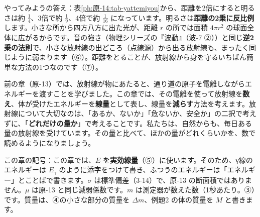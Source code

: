 \noindent やってみようの答え：表\ref{ph:原-14:tab-yattemiyou}から、距離を2倍にすると明るさは約 $\tfrac14$、3倍で約 $\tfrac19$、4倍で約 $\tfrac1{16}$ になっています。明るさは\textbf{距離の2乗に反比例}します。小さな所から四方八方に出た光が、距離 $r$ の所では面積 $4\pi r^2$ の球面全体に広がるからです。音の強さ（物理シリーズの『波動』（波-7 ②））と同じ\textbf{逆2乗の法則}で、小さな放射線の出どころ（点線源）から出る放射線も、まったく同じように弱まります（⑥）。距離をとることが、放射線から身を守るいちばん簡単な方法の1つなのです（⑦）。

前の章（原-13）では、放射線が物にあたると、通り道の原子を電離しながらエネルギーを渡すことを学びました。この章では、その電離を使って放射線を\textbf{数え}、体が受けたエネルギーを\textbf{線量}として表し、線量を\textbf{減らす}方法を考えます。放射線について大切なのは、「あるか、ないか」「危ないか、安全か」の二択で考えずに、「\textbf{どれだけの量か}」で考えることです。私たちは、自然からも、毎日ある量の放射線を受けています。その量と比べて、ほかの量がどれくらいかを、数で読めるようになりましょう。

\begin{omoidasou}
\end{omoidasou}

\noindent この章の記号：この章では、$E$ を\textbf{実効線量}（⑤）に使います。そのため、γ線のエネルギーは $E_\gamma$ のように添字をつけて書き、ふつうのエネルギーは「エネルギー」とことばで書きます。$\sigma$ は標準偏差（3-14）で、原-13 の断面積ではありません。$\mu$ は原-13 と同じ減弱係数です。$m$ は測定器が数えた数（1秒あたり。③）です。質量は、④の小さな部分の質量を $\Delta m$、例題2 の体の質量を $M$ と書きます。


